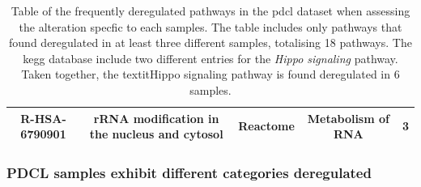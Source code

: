 \begin{table}
{\begin{tabular}{ |c|c|c|c|c| }
            R-HSA-6790901 & rRNA modification in the nucleus and cytosol & Reactome & Metabolism of RNA & 3 \\
            \hline
        \end{tabular}
    }
    \caption{
        Table of the frequently deregulated pathways in the \acrshort{pdcl} dataset when assessing the alteration specfic to each samples.
        The table includes only pathways that found deregulated in at least three different samples, totalising 18 pathways.
        The \acrshort{kegg} database include two different entries for the \textit{Hippo signaling} pathway.
        Taken together, the textit{Hippo signaling} pathway is found deregulated in 6 samples.
    }
    \label{table:frequently-dereg-pathways}
\end{table}

\subsubsection{PDCL samples exhibit different categories deregulated}

